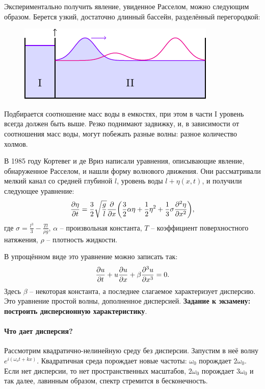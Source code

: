 Экспериментально получить явление, увиденное Расселом, можно следующим образом. Берется узкий, достаточно длинный бассейн, разделённый перегородкой:  
\begin{figure}[H]
	\centering
	\includegraphics[scale=1.5]{img/soliton/pool}
\end{figure}
Подбирается соотношение масс воды в емкостях, при этом в части I уровень всегда должен быть выше. Резко поднимают задвижку, и, в зависимости от соотношения масс воды, могут побежать разные волны: разное количество холмов. 

В 1985 году Кортевег и де Вриз написали уравнения, описывающие явление, обнаруженное Расселом, и нашли форму волнового движения. Они рассматривали мелкий канал  со средней глубиной $l$, уровень воды $l+\eta(x,t)$, и получили следующее уравнение: 
\begin{equation*}
	\pdv{\eta}{t}=\frac32 \sqrt{\frac{g}{l}}\pdv{}{x}\qty(\frac32 \alpha \eta+\frac12 \eta^2+\frac13 \sigma \pdv[2]{\eta}{x}),
\end{equation*}
где $\sigma=\frac{l^3}{3}-\frac{Tl}{\rho g}$, $\alpha$ -- произвольная константа, $T$ -- коэффициент поверхностного натяжения, $\rho$ -- плотность жидкости.

В упрощённом виде это уравнение можно записать так:
\begin{equation}
	\pdv{u}{t}+u\pdv{u}{x}+\beta \pdv[3]{u}{x}=0.
	\label{eq:s3:1}
\end{equation}
Здесь $\beta$ -- некоторая константа, а последнее слагаемое характеризует дисперсию. Это уравнение простой волны, дополненное дисперсией. \textbf{Задание к  экзамену: построить дисперсионную характеристику}. 

\paragraph{Что дает дисперсия? } Рассмотрим квадратично-нелинейную среду без дисперсии.
Запустим в неё волну $e^{i(\omega_o t+kx)}$. Квадратичная среда порождает новые частоты: $\omega_0$ порождает $2\omega_0$. Если нет дисперсии, то нет пространственных масштабов, $2\omega_0$ порождает $3\omega_0$ и так далее, лавинным образом, спектр стремится в бесконечность. 

